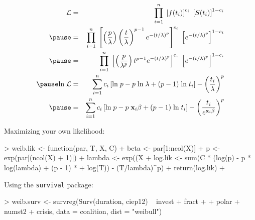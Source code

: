 \documentclass[handout]{beamer}
\begin{document}
\begin{frame}
\begin{eqnarray*}
\mathcal{L} &=& \prod^n_{i=1} \; \left[ f(t_i) \right] ^
{c_i} \; \left[ S(t_i) \right] ^ {1 - c_i} \\  
\pause 
&=&  \prod^n_{i=1} \; \left[  \left( \frac{p}{\lambda} \right) \left( \frac{t}{\lambda}
\right) ^ {p-1} e^{-(t/\lambda)^p} \right] ^
{c_i} \; \left[ e^{-(t/\lambda)^p} \right] ^ {1 - c_i} \\  
\pause
&=&  \prod^n_{i=1} \; \left[  \left( \frac{p}{\lambda ^p} \right) t^{p-1} e^{-(t/\lambda)^p} \right] ^{c_i} \; \left[ e^{-(t/\lambda)^p} \right] ^ {1 - c_i} \\  
\pause
\mathrm{ln} \; \mathcal{L} &=& \sum_{i=1}^n c_i \left[ \mathrm{ln} \;
p - p \; \mathrm{ln} \; \lambda + (p-1) \; \mathrm{ln} \; t_i \right] - \left(
\frac{t_i}{\lambda} \right) ^p\\
\pause
&=& \sum_{i=1}^n c_i \left[ \mathrm{ln} \;
p - p \; \mathbf{x}_i \beta + (p-1) \; \mathrm{ln} \; t_i \right] - \left(
\frac{t_i}{ e^{\mathbf{x}_i \beta}} \right) ^p\\
\end{eqnarray*}
\end{frame}

\begin{frame}[fragile]
Maximizing your own likelihood:
\pause
\tiny
\begin{Schunk}
\begin{Sinput}
> weib.lik <- function(par, T, X, C) {
+     beta <- par[1:ncol(X)]
+     p <- exp(par[(ncol(X) + 1)])
+     lambda <- exp((X %
+     log.lik <- sum(C * (log(p) - p * log(lambda) + (p - 1) * 
+         log(T)) - (T/lambda)^p)
+     return(log.lik)
+ }
\end{Sinput}
\end{Schunk}
\pause
\begin{Schunk}
\end{Schunk}
\pause
\normalsize
\bigskip
Using the {\tt survival} package:
\tiny
\begin{Schunk}
\begin{Sinput}
> weib.surv <- survreg(Surv(duration, ciep12) ~ invest + fract + 
+     polar + numst2 + crisis, data = coalition, dist = "weibull")
\end{Sinput}
\end{Schunk}
\end{frame}
\end{document}
